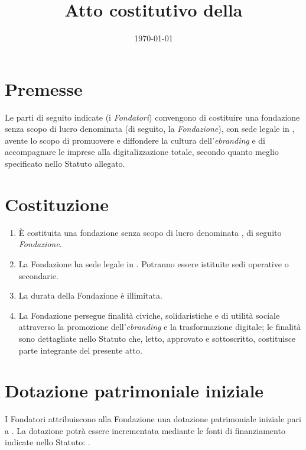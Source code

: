 \documentclass[11pt,a4paper]{article}
\title{Atto costitutivo della \FondazioneNome}
\author{}
\date{\today}
\begin{document}
\begin{center}
\end{center}

\maketitle

\section*{Premesse}
Le parti di seguito indicate (i \emph{Fondatori}) convengono di costituire una fondazione senza scopo di lucro denominata  (di seguito, la \emph{Fondazione}), con sede legale in \FondazioneSedeLegale, avente lo scopo di promuovere e diffondere la cultura dell'\emph{ebranding} e di accompagnare le imprese alla digitalizzazione totale, secondo quanto meglio specificato nello Statuto allegato.

\section*{Costituzione}
\begin{enumerate}[label=\arabic*)]
  \item È costituita una fondazione senza scopo di lucro denominata , di seguito \emph{Fondazione}.
  \item La Fondazione ha sede legale in . Potranno essere istituite sedi operative o secondarie.
  \item La durata della Fondazione è illimitata.
  \item La Fondazione persegue finalità civiche, solidaristiche e di utilità sociale attraverso la promozione dell'\emph{ebranding} e la trasformazione digitale; le finalità sono dettagliate nello Statuto che, letto, approvato e sottoscritto, costituisce parte integrante del presente atto.
\end{enumerate}

\section*{Dotazione patrimoniale iniziale}
I Fondatori attribuiscono alla Fondazione una dotazione patrimoniale iniziale pari a . La dotazione potrà essere incrementata mediante le fonti di finanziamento indicate nello Statuto: \FontiFinanziamento.
\end{document}
